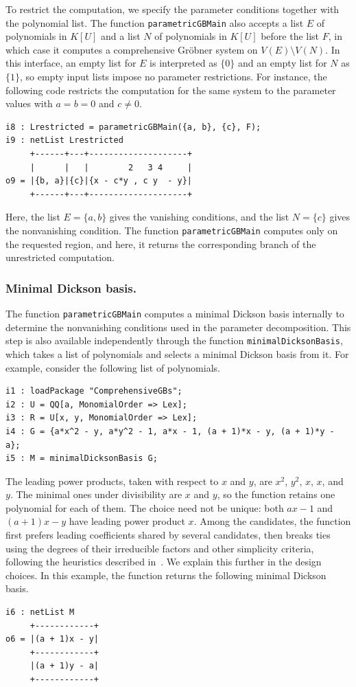 \documentclass[11pt]{amsart}
\theoremstyle{plain}
\theoremstyle{definition}
\theoremstyle{remark}
\begin{document}
To restrict the computation, we specify the parameter
conditions together with the polynomial list.
The function \texttt{parametricGBMain} also accepts a list $E$ of polynomials in $K[U]$ and a list $N$ of polynomials in $K[U]$ before the list $F$, in which case it computes a comprehensive Gröbner system on $V(E)\setminus V(N)$.
In this interface, an empty list for $E$ is interpreted as $\lbrace 0\rbrace$ and an empty list for $N$ as $\lbrace 1\rbrace$, so empty input lists impose no parameter restrictions.
For instance, the following code restricts the computation for the same system to the parameter values with $a=b=0$ and
$c\ne 0$.
\begin{lstlisting}
i8 : Lrestricted = parametricGBMain({a, b}, {c}, F);
i9 : netList Lrestricted
     +------+---+--------------------+
     |      |   |        2   3 4     |
o9 = |{b, a}|{c}|{x - c*y , c y  - y}|
     +------+---+--------------------+
\end{lstlisting}
Here, the list $E=\{a,b\}$ gives the vanishing conditions, and the list $N=\{c\}$ gives the nonvanishing condition. The function \texttt{parametricGBMain} computes only on the requested region, and here, it returns the corresponding branch of the unrestricted computation.

\subsubsection{Minimal Dickson basis.}
The function \texttt{parametricGBMain} computes a minimal
Dickson basis internally to determine the
nonvanishing conditions used in the parameter
decomposition. This step is also available
independently through the function \texttt{minimalDicksonBasis}, which
takes a list of polynomials and selects a
minimal Dickson basis from it.
For example, consider the following list of polynomials.
\begin{lstlisting}
i1 : loadPackage "ComprehensiveGBs";
i2 : U = QQ[a, MonomialOrder => Lex];
i3 : R = U[x, y, MonomialOrder => Lex];
i4 : G = {a*x^2 - y, a*y^2 - 1, a*x - 1, (a + 1)*x - y, (a + 1)*y - a};
i5 : M = minimalDicksonBasis G;
\end{lstlisting}
The leading power products, taken with respect
to $x$ and $y$, are $x^2$, $y^2$, $x$, $x$, and $y$.
The minimal ones under divisibility are $x$ and
$y$, so the function retains one polynomial
for each of them. The choice need not be unique: both $ax-1$ and
$(a+1)x-y$ have leading power product $x$.
Among the candidates, the function first prefers leading coefficients shared by several candidates, then breaks ties using the degrees of their irreducible factors and other simplicity criteria, following the heuristics described
in~\cite[Section~7.1]{KAPUR201327}.
We explain this further in the design choices.
In this example, the function returns the following minimal Dickson basis.
\begin{lstlisting}
i6 : netList M
     +------------+
o6 = |(a + 1)x - y|
     +------------+
     |(a + 1)y - a|
     +------------+
\end{lstlisting}
\end{document}
